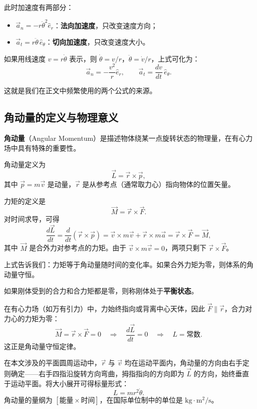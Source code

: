\documentclass[12pt,a4paper]{article}
\begin{document}
此时加速度有两部分：
\begin{itemize}
  \item $\vec{a}_n = -r\dot{\theta}^2\hat{e}_r$：\textbf{法向加速度}，只改变速度方向；
  \item $\vec{a}_t = r\ddot{\theta}\,\hat{e}_\theta$：\textbf{切向加速度}，只改变速度大小。
\end{itemize}

如果用线速度 $v = r\dot{\theta}$ 表示，则 $\dot{\theta} = v/r$，$\ddot{\theta} = \dot{v}/r$，上式可化为：
\[
\vec{a}_n = -\frac{v^2}{r}\hat{e}_r,\qquad
\vec{a}_t = \frac{dv}{dt}\,\hat{e}_\theta.
\]

这就是我们在正文中频繁使用的两个公式的来源。

\subsection{角动量的定义与物理意义}

\textbf{角动量}（Angular Momentum）是描述物体绕某一点旋转状态的物理量，在有心力场中具有特殊的重要性。

角动量定义为
\[
\vec{L} = \vec{r} \times \vec{p},
\]
其中 $\vec{p} = m\vec{v}$ 是动量，$\vec{r}$ 是从参考点（通常取力心）指向物体的位置矢量。

力矩的定义是
\[
\vec{M} = \vec{r} \times \vec{F}.
\]
对时间求导，可得
\[
\frac{d\vec{L}}{dt} = \frac{d}{dt}(\vec{r} \times \vec{p}) = \vec{v} \times m\vec{v} + \vec{r} \times m\vec{a} = \vec{r} \times \vec{F} = \vec{M},
\]
其中 $\vec{M}$ 是合外力对参考点的力矩。由于 $\vec{v} \times m\vec{v} = 0$，两项只剩下 $\vec{r} \times \vec{F}$。

上式告诉我们：力矩等于角动量随时间的变化率。如果合外力矩为零，则体系的角动量守恒。

如果刚体受到的合力和合力矩都是零，则称刚体处于\textbf{平衡状态}。

在有心力场（如万有引力）中，力始终指向或背离中心天体，因此 $\vec{F} \parallel \vec{r}$，合力对力心的力矩为零：
\[
\vec{M} = \vec{r} \times \vec{F} = 0 \quad\Longrightarrow\quad \frac{d\vec{L}}{dt} = 0 \quad\Longrightarrow\quad L = \text{常数}.
\]
这正是角动量守恒定律。

在本文涉及的平面圆周运动中，$\vec{r}$ 与 $\vec{v}$ 均在运动平面内，角动量的方向由右手定则确定——右手四指沿旋转方向弯曲，拇指指向的方向即为 $\vec{L}$ 的方向，始终垂直于运动平面。将大小展开可得标量形式：
\[
L = mr^2\dot{\theta}.
\]
角动量的量纲为 $[\text{能量}\times\text{时间}]$，在国际单位制中的单位是 $\text{kg}\cdot\text{m}^2/\text{s}$。
\end{document}

